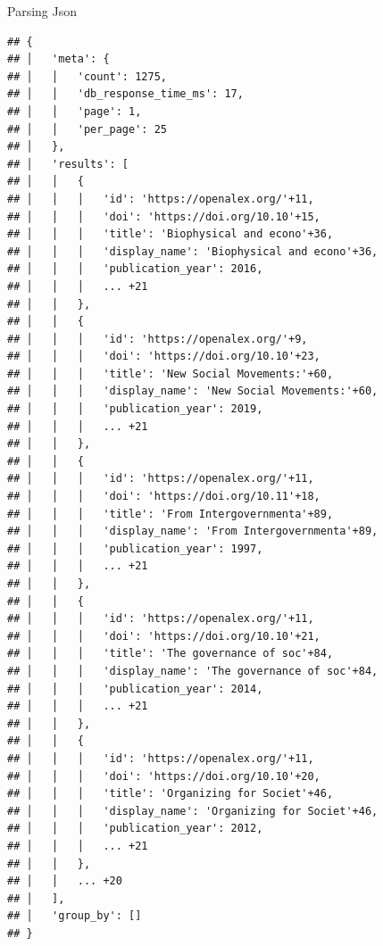 \documentclass[
  10pt,
  ignorenonframetext,
  aspectratio=169]{beamer}
\begin{document}
\begin{frame}[fragile]{Parsing Json}
\begin{verbatim}
## {
## │   'meta': {
## │   │   'count': 1275,
## │   │   'db_response_time_ms': 17,
## │   │   'page': 1,
## │   │   'per_page': 25
## │   },
## │   'results': [
## │   │   {
## │   │   │   'id': 'https://openalex.org/'+11,
## │   │   │   'doi': 'https://doi.org/10.10'+15,
## │   │   │   'title': 'Biophysical and econo'+36,
## │   │   │   'display_name': 'Biophysical and econo'+36,
## │   │   │   'publication_year': 2016,
## │   │   │   ... +21
## │   │   },
## │   │   {
## │   │   │   'id': 'https://openalex.org/'+9,
## │   │   │   'doi': 'https://doi.org/10.10'+23,
## │   │   │   'title': 'New Social Movements:'+60,
## │   │   │   'display_name': 'New Social Movements:'+60,
## │   │   │   'publication_year': 2019,
## │   │   │   ... +21
## │   │   },
## │   │   {
## │   │   │   'id': 'https://openalex.org/'+11,
## │   │   │   'doi': 'https://doi.org/10.11'+18,
## │   │   │   'title': 'From Intergovernmenta'+89,
## │   │   │   'display_name': 'From Intergovernmenta'+89,
## │   │   │   'publication_year': 1997,
## │   │   │   ... +21
## │   │   },
## │   │   {
## │   │   │   'id': 'https://openalex.org/'+11,
## │   │   │   'doi': 'https://doi.org/10.10'+21,
## │   │   │   'title': 'The governance of soc'+84,
## │   │   │   'display_name': 'The governance of soc'+84,
## │   │   │   'publication_year': 2014,
## │   │   │   ... +21
## │   │   },
## │   │   {
## │   │   │   'id': 'https://openalex.org/'+11,
## │   │   │   'doi': 'https://doi.org/10.10'+20,
## │   │   │   'title': 'Organizing for Societ'+46,
## │   │   │   'display_name': 'Organizing for Societ'+46,
## │   │   │   'publication_year': 2012,
## │   │   │   ... +21
## │   │   },
## │   │   ... +20
## │   ],
## │   'group_by': []
## }
\end{verbatim}
\end{frame}
\end{document}
